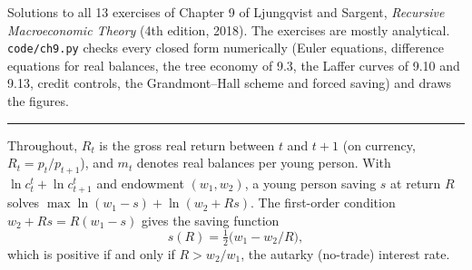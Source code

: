 \documentclass[11pt,letterpaper,reqno]{amsart}
\begin{document}
\begin{center}
\begin{minipage}{0.86\textwidth}
\small
Solutions to all 13 exercises of Chapter 9 of Ljungqvist and Sargent, \emph{Recursive Macroeconomic Theory} (4th edition, 2018).  The exercises are mostly analytical.
\texttt{code/ch9.py} checks every closed form numerically (Euler equations, difference equations for real balances, the tree economy of 9.3, the Laffer curves of 9.10 and
9.13, credit controls, the Grandmont--Hall scheme and forced saving) and draws the figures.
\end{minipage}
\end{center}

\bigskip
\hrule
\bigskip

Throughout, $R_t$ is the gross real return between $t$ and $t+1$ (on currency, $R_t=p_t/p_{t+1}$), and $m_t$ denotes real balances per young person.  With $\ln c^t_t+\ln c^t_{t+1}$ and
endowment $(w_1,w_2)$, a young person saving $s$ at return $R$ solves $\max\ln(w_1-s)+\ln(w_2+Rs)$.  The first-order condition $w_2+Rs=R(w_1-s)$ gives the saving function
\[
  s(R)=\tfrac12\bigl(w_1-w_2/R\bigr),
\]
which is positive if and only if $R>w_2/w_1$, the autarky (no-trade) interest rate.
\end{document}

